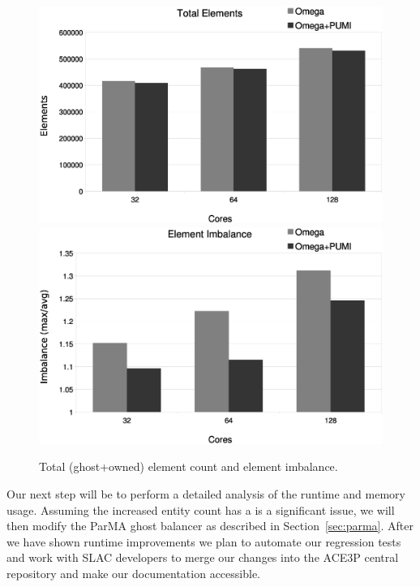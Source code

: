 \documentclass[a4paper]{article}
\begin{document}
\begin{figure}[ht]
\centering
  \includegraphics[width=\textwidth]{total-elms.eps} \\
  \includegraphics[width=\textwidth]{elm-imb.eps} \\
  \caption{\label{fig:elm} Total (ghost+owned) element count and element imbalance.}
\end{figure}

Our next step will be to perform a detailed analysis of the runtime and memory
usage.
Assuming the increased entity count has a is a significant issue, we will then modify
the ParMA ghost balancer as described in Section~\ref{sec:parma}.
After we have shown runtime improvements we plan to automate our regression
tests and work with SLAC developers to merge our changes into
the ACE3P central repository and make our documentation accessible.

\newpage 

\end{document}
